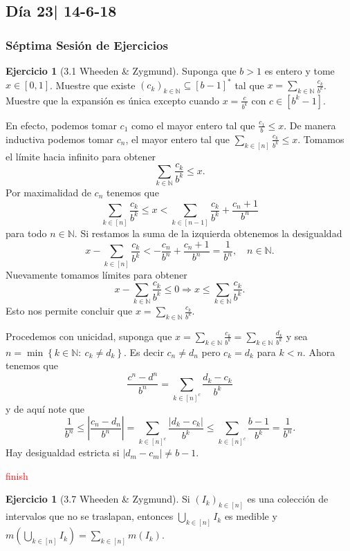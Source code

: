 \documentclass[12pt]{article}
\theoremstyle{plain}
\theoremstyle{definition}
\newtheorem{Ej}[Th]{Ejercicio}
\theoremstyle{remark}
\numberwithin{equation}{section}
\newcommand{\bN}{\mathbb{N}}        %
\renewcommand{\leq}{\leqslant}      %
\renewcommand{\:}{\colon}           %
\newcommand{\conj}[1]{\left\lbrace#1\right\rbrace}
\newcommand{\bonj}[1]{\left\lbrack#1\right\rbrack}
\begin{document}
\begin{multicols}{2}
\subsection{Día 23| 14-6-18}
\subsubsection*{Séptima Sesión de Ejercicios}

\begin{Ej}[3.1  Wheeden \& Zygmund]
  Suponga que $b>1$ es entero y tome $x\in\bonj{0,1}$. Muestre que existe $(c_k)_{k\in\bN}\subseteq\bonj{b-1}^*$ tal que $x=\sum_{k\in\bN}\frac{c_k}{b^k}$. Muestre que la expansión es única excepto cuando $x=\frac{c}{b^k}$ con $c\in\bonj{b^k-1}$.
\end{Ej}

\begin{ptcbp}
En efecto, podemos tomar $c_1$ como el mayor entero tal que $\frac{c_1}{b}\leq x$. De manera inductiva podemos tomar $c_n$, el mayor entero tal que $\sum_{k\in\bonj{n}}\frac{c_k}{b^k}\leq x$. Tomamos el límite hacia infinito para obtener $$\sum_{k\in\bN}\frac{c_k}{b^k}\leq x.$$
Por maximalidad de $c_n$ tenemos que
$$\sum_{k\in\bonj{n}}\frac{c_k}{b^k}\leq x<\sum_{k\in\bonj{n-1}}\frac{c_k}{b^k}+\frac{c_n+1}{b^n}$$
para todo $n\in\bN$. Si restamos la suma de la izquierda obtenemos la desigualdad
$$x-\sum_{k\in\bonj{n}}\frac{c_k}{b^k}<-\frac{c_n}{b^n}+\frac{c_n+1}{b^n}=\frac{1}{b^n},\quad n\in\bN.$$
Nuevamente tomamos límites para obtener
$$x-\sum_{k\in\bN}\frac{c_k}{b^k}\leq 0\Rightarrow x\leq \sum_{k\in\bN}\frac{c_k}{b^k}.$$
Esto nos permite concluir que $x=\sum_{k\in\bN}\frac{c_k}{b^k}$.\par
Procedemos con unicidad, suponga que $x=\sum_{k\in\bN}\frac{c_k}{b^k}=\sum_{k\in\bN}\frac{d_k}{b^k}$ y sea $n=\min\conj{k\in\bN\:\ c_k\neq d_k}$. Es decir $c_n\neq d_n$ pero $c_k=d_k$ para $k<n$. Ahora tenemos que
$$\frac{c^n-d^n}{b^n}=\sum_{k\in\bonj{n}^c}\frac{d_k-c_k}{b^k}$$
y de aquí note que
$$\frac{1}{b^n}\leq |\frac{c_n-d_n}{b^n}|=\sum_{k\in\bonj{n}^c}\frac{|d_k-c_k|}{b^k}\leq\sum_{k\in\bonj{n}^c}\frac{b-1}{b^k}=\frac{1}{b^n}.$$
Hay desigualdad estricta si $|d_m-c_m|\neq b-1$.\par
\textcolor{red}{finish}
\end{ptcbp}

\begin{Ej}[3.7  Wheeden \& Zygmund]
Si $(I_k)_{k\in\bonj{n}}$ es una colección de intervalos que no se traslapan, entonces $\bigcup_{k\in\bonj{n}}I_k$ es medible y $m(\bigcup_{k\in\bonj{n}}I_k)=\sum_{k\in\bonj{n}}m(I_k)$.
\end{Ej}


\end{multicols}
\end{document}
